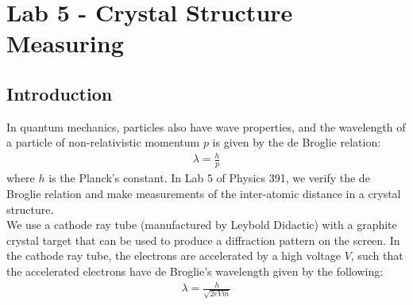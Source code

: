 \documentclass[11pt]{book}
\theoremstyle{break}
\theoremstyle{break}
\begin{document}
\newpage
\tableofcontents
{}


\setcounter{chapter}{3}
\chapter*{Lab 5 - Crystal Structure Measuring}
\section{Introduction}
In quantum mechanics, particles also have wave properties, and the wavelength of a particle of non-relativistic momentum $p$ is given by the de Broglie relation:
\begin{align*}
\lambda = \frac{h}{p}
\end{align*}
where $h$ is the Planck's constant. In Lab 5 of Physics 391, we verify the de Broglie relation and make measurements of the inter-atomic distance in a crystal structure.\\


We use a cathode ray tube (manufactured by Leybold Didactic) with a graphite crystal target that can be used to produce a diffraction pattern on the screen. In the cathode ray tube, the electrons are accelerated by a high voltage $V$, such that the accelerated electrons have de Broglie's wavelength given by the following:
\begin{align}
\lambda = \frac{h}{\sqrt{2eVm}}
\end{align}
\end{document}
